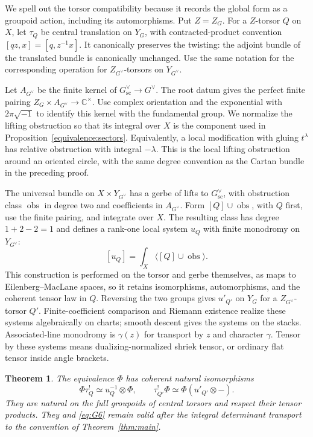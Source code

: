 \documentclass[11pt]{article}
\numberwithin{equation}{section}
\newtheorem{theorem}{Theorem}[section]
\theoremstyle{definition}
\theoremstyle{remark}
\begin{document}
We spell out the torsor compatibility because it records the global
form as a groupoid action, including its automorphisms.  Put \(Z=Z_G\).
For a \(Z\)-torsor \(Q\) on \(X\), let \(\tau_Q\) be central
translation on \(Y_G\), with contracted-product convention
\([qz,x]=[q,z^{-1}x]\).  It canonically preserves the twisting: the
adjoint bundle of the translated bundle is canonically unchanged.
Use the same notation for the corresponding operation for
\(Z_{G^\vee}\)-torsors on \(Y_{G^\vee}\).

Let \(A_{G^\vee}\) be the finite kernel of
\(G^\vee_{\mathrm{sc}}\to G^\vee\).  The root datum gives the
perfect finite pairing
\(Z_G\times A_{G^\vee}\to\mathbb C^\times\).  Use complex
orientation and the exponential with \(2\pi\sqrt{-1}\) to identify
this kernel with the fundamental group.  We normalize the lifting
obstruction so that its integral over \(X\) is the component used in
Proposition~\ref{equivalence:sectors}.  Equivalently, a local
modification with gluing \(t^\lambda\) has relative obstruction
with integral \(-\lambda\).  This is the local lifting obstruction
around an oriented circle, with the same degree convention as the
Cartan bundle in the preceding proof.

The universal bundle on \(X\times Y_{G^\vee}\) has a gerbe of lifts
to \(G^\vee_{\mathrm{sc}}\), with obstruction class
\(\operatorname{obs}\) in degree two and coefficients in
\(A_{G^\vee}\).  Form \([Q]\cup\operatorname{obs}\), with
\(Q\) first, use the finite pairing, and integrate over \(X\).
The resulting class has degree \(1+2-2=1\) and defines a rank-one
local system \(u_Q\) with finite monodromy on \(Y_{G^\vee}\):
\[
 [u_Q]=\int_X\bigl\langle[Q]\cup\operatorname{obs}\bigr\rangle.
\]
This construction is performed on the
torsor and gerbe themselves, as maps to Eilenberg--MacLane spaces,
so it retains isomorphisms, automorphisms, and the coherent tensor law
in \(Q\).  Reversing the two groups gives \(u'_{Q'}\) on \(Y_G\)
for a \(Z_{G^\vee}\)-torsor \(Q'\).  Finite-coefficient comparison
and Riemann existence realize these systems algebraically on charts;
smooth descent gives the systems on the stacks.  Associated-line
monodromy is \(\gamma(z)\) for transport by \(z\) and character
\(\gamma\).  Tensor by these systems means dualizing-normalized
shriek tensor, or ordinary flat tensor inside angle brackets.

\begin{theorem}\label{equivalence:central}
The equivalence \(\Phi\) has coherent natural isomorphisms
\begin{equation}\label{eq:G7}
 \Phi\tau_Q^!\simeq u_Q^{-1}\otimes\Phi,
 \qquad
 \tau_{Q'}^!\Phi\simeq\Phi(u'_{Q'}\otimes-).
\end{equation}
They are natural on the full groupoids of central torsors and respect
their tensor products.  They and \eqref{eq:G6} remain valid after the
integral determinant transport to the convention of
Theorem~\ref{thm:main}.
\end{theorem}
\end{document}
